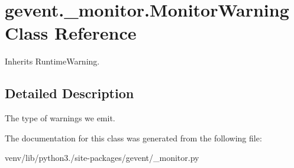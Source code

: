 \hypertarget{classgevent_1_1__monitor_1_1_monitor_warning}{}\section{gevent.\+\_\+monitor.\+Monitor\+Warning Class Reference}
\label{classgevent_1_1__monitor_1_1_monitor_warning}


Inherits Runtime\+Warning.



\subsection{Detailed Description}
\begin{DoxyVerb}The type of warnings we emit.\end{DoxyVerb}
 

The documentation for this class was generated from the following file\+:\begin{DoxyCompactItemize}
\item 
venv/lib/python3./site-\/packages/gevent/\+\_\+monitor.\+py\end{DoxyCompactItemize}
